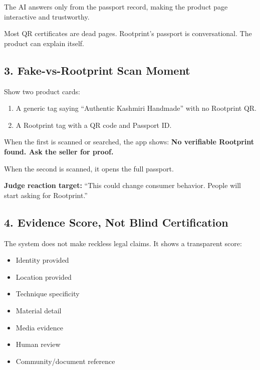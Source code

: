 \documentclass[11pt,a4paper]{article}
\begin{document}
The AI answers only from the passport record, making the product page interactive and trustworthy.

\begin{goldbox}
Most QR certificates are dead pages. Rootprint's passport is conversational. The product can explain itself.
\end{goldbox}

\subsection{3. Fake-vs-Rootprint Scan Moment}

Show two product cards:

\begin{enumerate}
  \item A generic tag saying ``Authentic Kashmiri Handmade'' with no Rootprint QR.
  \item A Rootprint tag with a QR code and Passport ID.
\end{enumerate}

When the first is scanned or searched, the app shows: \textbf{No verifiable Rootprint found. Ask the seller for proof.}

When the second is scanned, it opens the full passport.

\begin{blackbox}
\textbf{Judge reaction target:} ``This could change consumer behavior. People will start asking for Rootprint.''
\end{blackbox}

\subsection{4. Evidence Score, Not Blind Certification}

The system does not make reckless legal claims. It shows a transparent score:

\begin{itemize}
  \item Identity provided
  \item Location provided
  \item Technique specificity
  \item Material detail
  \item Media evidence
  \item Human review
  \item Community/document reference
\end{itemize}
\end{document}
